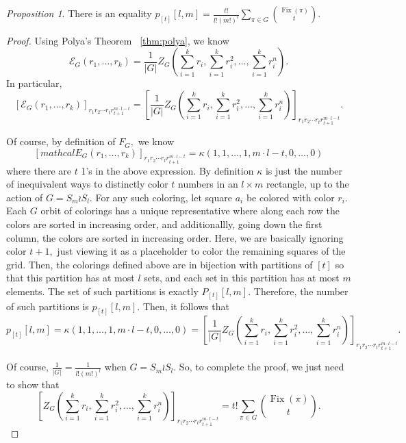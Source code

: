 \documentclass[10 pt]{amsart}
\theoremstyle{plain}
\theoremstyle{definition}
\theoremstyle{remark}
\numberwithin{equation}{section}
\newtheorem{prop}[thm]{Proposition}
\theoremstyle{remark}
\def\Fix{\operatorname{Fix}}
\begin{document}
\begin{prop}
\label{prop:box_partition_by_size}
There is an equality $p_{[t]}[l,m] = \frac {t!}{l!(m!)^l}\sum_{\pi \in G} \binom {\Fix(\pi)} t.$
\end{prop}
\begin{proof}
Using Polya's Theorem ~\ref{thm:polya}, we know 
$$\mathcal E_G(r_1,\ldots, r_k) = \frac 1 {|G|}Z_G(\sum_{i=1}^k r_i,\sum_{i=1}^k r_i^2,\ldots, \sum_{i=1}^k r_i^n).$$ In particular, 
$$[\mathcal E_G(r_1,\ldots, r_k)]_{r_1 r_2 \cdots r_t r_{t+1}^{m\cdot l-t}} = [\frac 1 {|G|}Z_G(\sum_{i=1}^k r_i,\sum_{i=1}^k r_i^2,\ldots, \sum_{i=1}^k r_i^n)]_{r_1 r_2 \cdots r_t r_{t+1}^{m\cdot l - t}}.$$

Of course, by definition of $F_G,$ we know 
$$[mathcal E_G(r_1,\ldots, r_k)]_{r_1 r_2 \cdots r_t r_{t+1}^{m\cdot l-t}} = \kappa(1,1,\ldots, 1,m \cdot l - t,0,\ldots, 0)$$
where there are $t$ 1's in the above expression. By definition $\kappa$ is just the number of inequivalent ways to distinctly color $t$ numbers in an $l \times m$ rectangle, up to the action of $G = S_m \wr S_l.$ For any such coloring, let square $a_i$ be colored with color $r_i.$ Each $G$ orbit of colorings has a unique representative where along each row the colors are sorted in increasing order, and additionallly, going down the first column, the colors are sorted in increasing order. Here, we are basically ignoring color $t+1,$ just viewing it as a placeholder to color the remaining squares of the grid. Then, the colorings defined above are in bijection with partitions of $[t]$ so that this partition has at most $l$ sets, and each set in this partition has at most $m$ elements. The set of such partitions is exactly  $P_{[t]}[l,m].$ Therefore, the number of such partitions is $p_{[t]}[l,m].$ Then, it follows that
$$p_{[t]}[l,m] = \kappa(1,1,\ldots, 1,m \cdot l - t,0,\ldots, 0) = [\frac 1 {|G|}Z_G(\sum_{i=1}^k r_i,\sum_{i=1}^k r_i^2,\ldots, \sum_{i=1}^k r_i^n)]_{r_1 r_2 \cdots r_t r_{t+1}^{m\cdot l - t}}.$$

Of course, $\frac 1 {|G|} = \frac 1 {l!(m!)^l}$ when $G = S_m \wr S_l.$ So, to complete the proof, we just need to show that 
$$[Z_G(\sum_{i=1}^k r_i,\sum_{i=1}^k r_i^2,\ldots, \sum_{i=1}^k r_i^n)]_{r_1 r_2 \cdots r_t r_{t+1}^{m\cdot l - t}} =  t!\sum_{\pi \in G} \binom {\Fix(\pi)} t.$$


\end{proof}
\end{document}
